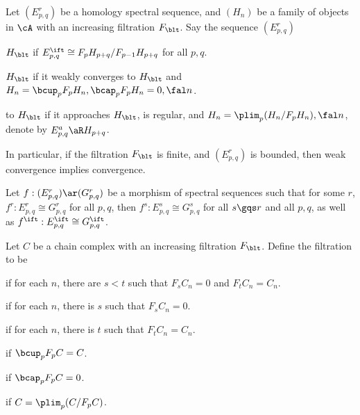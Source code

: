 \documentclass[article, a4paper, twoside]{universal}
\begin{document}
\begin{dfn}[5.2.5, 5.2.11]
    Let $(E_{p,q}^{r})$ be a homology spectral sequence, and $(H_{n})$ be a family of objects in $\cA$ with an increasing filtration $F_{\blt}$. Say the sequence $(E_{p,q}^{r})$
    \begin{itm}
        \item {} $H_{\blt}$ if $E_{p,q}^{\ift}\cong F_{p}H_{p+q}/F_{p-1}H_{p+q}$ for all $p,q$.
        \item {} $H_{\blt}$ if it weakly converges to $H_{\blt}$ and $H_{n}=\bcup_{p} F_{p}H_{n},\bcap_{p}F_{p}H_{n}=0,\fal n$.
        \item {} to $H_{\blt}$ if it approaches $H_{\blt}$, is regular, and $H_{n}=\plim_{p}(H_{n}/F_{p}H_{n}),\fal n$, denote by $E_{p,q}^{a}\aR H_{p+q}$.
    \end{itm}

    In particular, if the filtration $F_{\blt}$ is finite, and $(E_{p,q}^{r})$ is bounded, then weak convergence implies convergence.
\end{dfn}

\begin{thm}
    Let $f:(E_{p,q}^{r})\ar(G_{p,q}^{r})$ be a morphism of spectral sequences such that for some $r$, $f^{r}:E_{p,q}^{r}\cong G_{p,q}^{r}$ for all $p,q$, then $f^{s}:E_{p,q}^{s}\cong G_{p,q}^{s}$ for all $s\gqs r$ and all $p,q$, as well as $f^{\ift}:E_{p,q}^{\ift}\cong G_{p,q}^{\ift}$.
\end{thm}

\begin{dfn}
    Let $C$ be a chain complex with an increasing filtration $F_{\blt}$. Define the filtration to be
    \begin{itm}
        \item {} if for each $n$, there are $s<t$ such that $F_{s}C_{n}=0$ and $F_{t}C_{n}=C_{n}$.
        \item {} if for each $n$, there is $s$ such that $F_{s}C_{n}=0$.
        \item {} if for each $n$, there is $t$ such that $F_{t}C_{n}=C_{n}$.
        \item {} if $\bcup_{p}F_{p}C=C$.
        \item {} if $\bcap_{p}F_{p}C=0$.
        \item {} if $C=\plim_{p}(C/F_{p}C)$.
    \end{itm}
\end{dfn}
\end{document}
